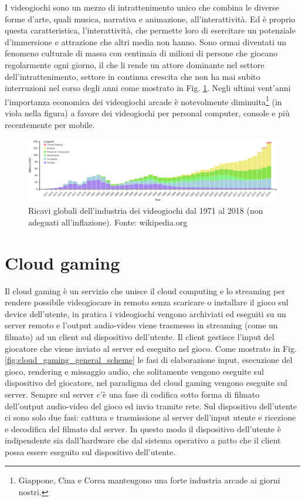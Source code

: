 I videogiochi sono un mezzo di intrattenimento unico che combina le diverse forme d'arte, quali musica, narrativa e animazione, all'interattività. Ed è proprio questa caratteristica, l'interattività, che permette loro di esercitare un potenziale d'immersione e attrazione che altri media non hanno. Sono ormai diventati un fenomeno culturale di massa con centinaia di milioni di persone che giocano regolarmente ogni giorno, il che li rende un attore dominante nel settore dell'intrattenimento, settore in continua crescita che non ha mai subito interruzioni nel corso degli anni come mostrato in Fig. \ref{fig:valore_commerciale_giochi_globale}. Negli ultimi vent'anni l'importanza economica dei videogiochi arcade è notevolmente diminuita\footnote{Giappone, Cina e Corea mantengono una forte industria arcade ai giorni nostri.} (in viola nella figura) a favore dei videogiochi per personal computer, console e più recentemente per mobile.

\begin{figure}[H]
	\includegraphics[width=\linewidth]{immagini/valore_commerciale_giochi_globale.png}
	\caption{Ricavi globali dell'industria dei videogiochi dal 1971 al 2018 (non adeguati all'inflazione). Fonte: wikipedia.org}
	\label{fig:valore_commerciale_giochi_globale}
\end{figure}




\section{Cloud gaming}
Il cloud gaming è un servizio che unisce il cloud computing e lo streaming per rendere possibile videogiocare in remoto senza scaricare o installare il gioco sul device dell'utente, in pratica i videogiochi vengono archiviati ed eseguiti su un server remoto e l'output audio-video viene trasmesso in streaming (come un filmato) ad un client sul dispositivo dell'utente. Il client gestisce l'input del giocatore che viene inviato al server ed eseguito nel gioco. Come mostrato in Fig. \ref{fig:cloud_gaming_general_scheme} le fasi di elaborazione input, esecuzione del gioco, rendering e missaggio audio, che solitamente vengono eseguite sul dispositivo del giocatore, nel paradigma del cloud gaming vengono eseguite sul server. Sempre sul server c'è una fase di codifica sotto forma di filmato dell'output audio-video del gioco ed invio tramite rete. Sul dispositivo dell'utente ci sono solo due fasi: cattura e trasmissione al server dell'input utente e ricezione e decodifica del filmato dal server. In questo modo il dispositivo dell'utente è indipendente sia dall'hardware che dal sistema operativo a patto che il client possa essere eseguito sul dispositivo dell'utente.


